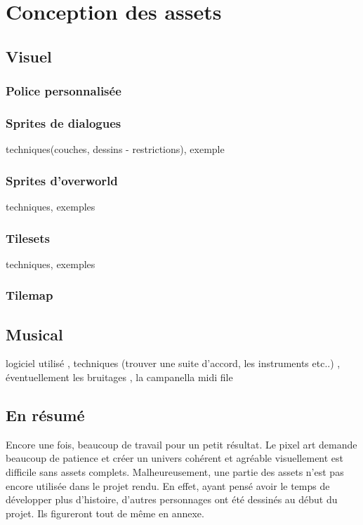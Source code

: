 \documentclass[11pt]{article}
\begin{document}
\section{Conception des assets}
\subsection{Visuel}
\subsubsection{Police personnalisée}
\subsubsection{Sprites de dialogues}
techniques(couches, dessins - restrictions), exemple 
\subsubsection{Sprites d'overworld}
techniques, exemples
\subsubsection{Tilesets}
techniques, exemples
\subsubsection{Tilemap}
\subsection{Musical}
logiciel utilisé , techniques (trouver une suite d'accord, les instruments etc..) , éventuellement les bruitages , la campanella midi file
\subsection{En résumé}
Encore une fois, beaucoup de travail pour un petit résultat. Le pixel art demande beaucoup de patience et créer un univers cohérent et agréable visuellement est difficile sans assets complets. Malheureusement, une partie des assets n'est pas encore utilisée dans le projet rendu. En effet, ayant pensé avoir le temps de développer plus d'histoire, d'autres personnages ont été dessinés au début du projet. Ils figureront tout de même en annexe.
\end{document}
